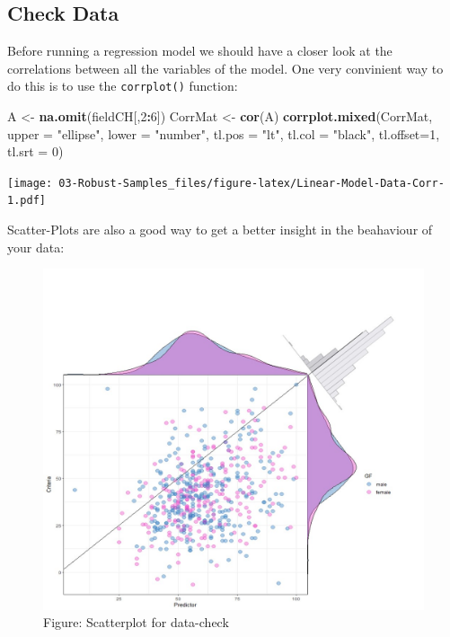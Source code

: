 \documentclass[
]{article}
\newenvironment{Shaded}{\begin{snugshade}}{\end{snugshade}}
\newcommand{\AttributeTok}[1]{\textcolor[rgb]{0.13,0.29,0.53}{#1}}
\newcommand{\DecValTok}[1]{\textcolor[rgb]{0.00,0.00,0.81}{#1}}
\newcommand{\FunctionTok}[1]{\textcolor[rgb]{0.13,0.29,0.53}{\textbf{#1}}}
\newcommand{\NormalTok}[1]{#1}
\newcommand{\OtherTok}[1]{\textcolor[rgb]{0.56,0.35,0.01}{#1}}
\newcommand{\SpecialCharTok}[1]{\textcolor[rgb]{0.81,0.36,0.00}{\textbf{#1}}}
\newcommand{\StringTok}[1]{\textcolor[rgb]{0.31,0.60,0.02}{#1}}
\begin{document}
\subsection*{Check Data}\label{check-data}

Before running a regression model we should have a closer look at the correlations between all the variables of the model. One very convinient way to do this is to use the \texttt{corrplot()} function:

\begin{Shaded}
\begin{Highlighting}[]
\NormalTok{  A }\OtherTok{\textless{}{-}} \FunctionTok{na.omit}\NormalTok{(fieldCH[,}\DecValTok{2}\SpecialCharTok{:}\DecValTok{6}\NormalTok{])}
\NormalTok{  CorrMat }\OtherTok{\textless{}{-}} \FunctionTok{cor}\NormalTok{(A)}
  \FunctionTok{corrplot.mixed}\NormalTok{(CorrMat, }\AttributeTok{upper =} \StringTok{"ellipse"}\NormalTok{, }\AttributeTok{lower =} \StringTok{"number"}\NormalTok{,}
                 \AttributeTok{tl.pos =} \StringTok{"lt"}\NormalTok{, }\AttributeTok{tl.col =} \StringTok{"black"}\NormalTok{, }\AttributeTok{tl.offset=}\DecValTok{1}\NormalTok{, }\AttributeTok{tl.srt =} \DecValTok{0}\NormalTok{)  }
\end{Highlighting}
\end{Shaded}

\texttt{[image: 03-Robust-Samples\_files/figure-latex/Linear-Model-Data-Corr-1.pdf]}

Scatter-Plots are also a good way to get a better insight in the beahaviour of your data:

\begin{figure}
\centering
\includegraphics{Images/UltimateScatterPlot.jpg}
\caption{Figure: Scatterplot for data-check}
\end{figure}
\end{document}
